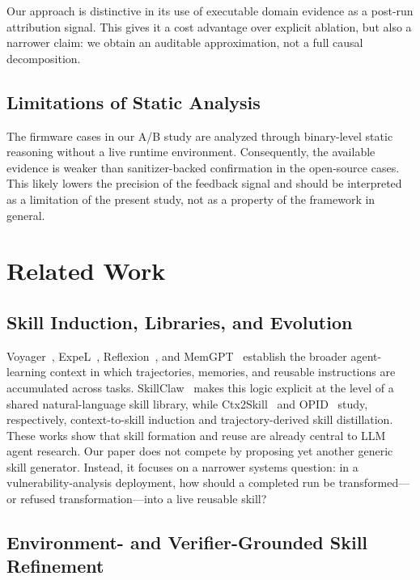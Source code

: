 ﻿\documentclass[preprint,12pt]{elsarticle}
\begin{document}
Our approach is distinctive in its use of executable domain evidence as a
post-run attribution signal.  This gives it a cost advantage over explicit
ablation, but also a narrower claim: we obtain an auditable approximation,
not a full causal decomposition.

\subsection{Limitations of Static Analysis}

The firmware cases in our A/B study are analyzed through binary-level
static reasoning without a live runtime environment.  Consequently, the
available evidence is weaker than sanitizer-backed confirmation in the
open-source cases.  This likely lowers the precision of the feedback signal
and should be interpreted as a limitation of the present study, not as a
property of the framework in general.

\section{Related Work}
\label{sec:related}

\subsection{Skill Induction, Libraries, and Evolution}

Voyager~\cite{voyager}, ExpeL~\cite{expel}, Reflexion~\cite{reflexion},
and MemGPT~\cite{memgpt} establish the broader agent-learning context in
which trajectories, memories, and reusable instructions are accumulated
across tasks.  SkillClaw~\cite{skillclaw} makes this logic explicit at the
level of a shared natural-language skill library, while
Ctx2Skill~\cite{ctx2skill} and OPID~\cite{opid} study, respectively,
context-to-skill induction and trajectory-derived skill distillation.
These works show that skill formation and reuse are already central to LLM
agent research.  Our paper does not compete by proposing yet another
generic skill generator.  Instead, it focuses on a narrower systems
question: in a vulnerability-analysis deployment, how should a completed
run be transformed---or refused transformation---into a live reusable
skill?

\subsection{Environment- and Verifier-Grounded Skill Refinement}
\end{document}

